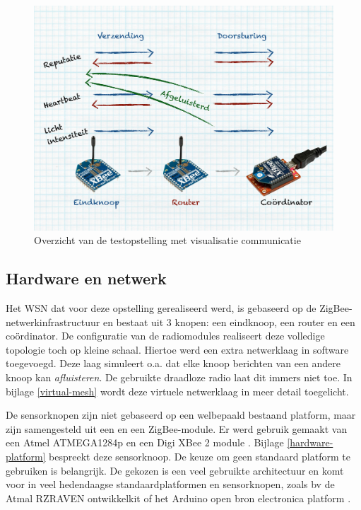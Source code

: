\begin{figure}[ht]
  \centering
  \includegraphics[width=0.75\linewidth]{resources/setup.pdf}
  \caption{Overzicht van de testopstelling met visualisatie communicatie}
  \label{fig:setup}
\end{figure}

\vspace{-5mm}

\subsection{Hardware en netwerk}
\label{subsection:eval-hardware}

Het WSN dat voor deze opstelling gerealiseerd werd, is gebaseerd op de
ZigBee-netwerkinfrastructuur en bestaat uit 3 knopen: een eindknoop, een router
en een co\"ordinator. De configuratie van de radiomodules realiseert deze
volledige topologie toch op kleine schaal. Hiertoe werd een extra netwerklaag
in software toegevoegd. Deze laag simuleert o.a. dat elke knoop berichten van
een andere knoop kan \emph{afluisteren}. De gebruikte draadloze radio laat dit
immers niet toe. In bijlage \ref{virtual-mesh} wordt deze virtuele netwerklaag
in meer detail toegelicht.

De sensorknopen zijn niet gebaseerd op een welbepaald bestaand platform, maar
zijn samengesteld uit een \mcu en een ZigBee-module. Er werd gebruik gemaakt
van een Atmel ATMEGA1284p \citep{datasheet:atmega1284p} en een Digi XBee 2
module \citep{manual:xbee}. Bijlage \ref{hardware-platform} bespreekt deze
sensorknoop. De keuze om geen standaard platform te gebruiken is belangrijk. De
gekozen \mcu is een veel gebruikte architectuur en komt voor in veel
hedendaagse standaardplatformen en sensorknopen, zoals bv de Atmal RZRAVEN
ontwikkelkit \citep{manual:rzraven} of het Arduino open bron electronica
platform \citep{url:arduino}.

